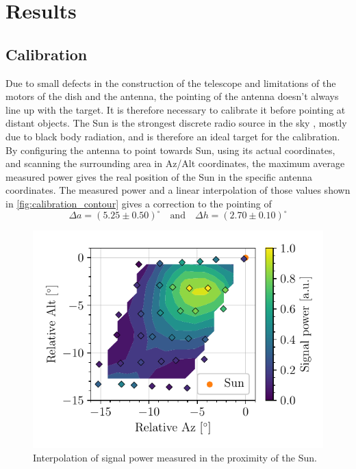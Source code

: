 \section{Results}
\subsection{Calibration} \label{sec:calibration}
Due to small defects in the construction of the telescope and limitations of the motors of the dish and the antenna, the pointing of the antenna doesn't always line up with the target. It is therefore necessary to calibrate it before pointing at distant objects. The Sun is the strongest discrete radio source in the sky \cite{burke_introduction_2013}, mostly due to black body radiation, and is therefore an ideal target for the calibration.
By configuring the antenna to point towards Sun, using its actual coordinates, and scanning the surrounding area in Az/Alt coordinates, the maximum average measured power gives the real position of the Sun in the specific antenna coordinates. The measured power and a linear interpolation of those values shown in \autoref{fig:calibration_contour} gives a correction to the pointing of
\begin{equation} \label{eq:offset}
    \Delta a = (5.25 \pm 0.50)^\circ \quad \textrm{and} \quad \Delta h = (2.70 \pm 0.10)^\circ
\end{equation}
\begin{figure}[htbp]
    \centering
    \includegraphics[scale=1]{figures/calibration_contour.pdf}
    \caption{Interpolation of signal power measured in the proximity of the Sun.}
    \label{fig:calibration_contour}
\end{figure}

